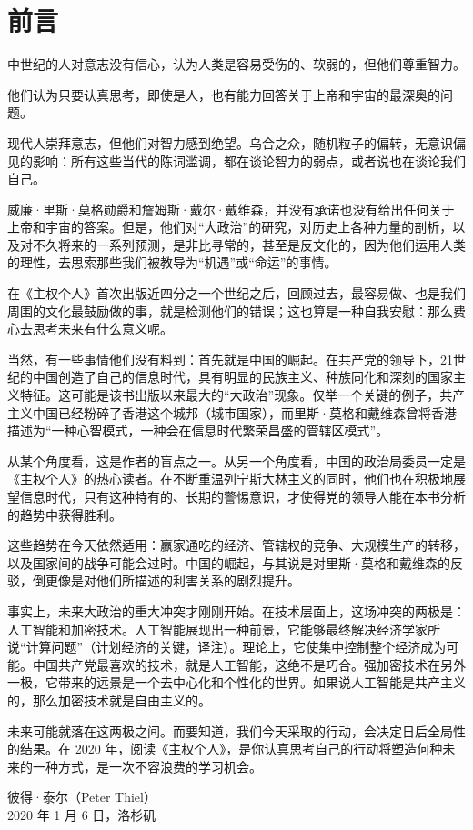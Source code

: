 \thispagestyle{empty}
\chapter*{前言}

中世纪的人对意志没有信心，认为人类是容易受伤的、软弱的，但他们尊重智力。

他们认为只要认真思考，即使是人，也有能力回答关于上帝和宇宙的最深奥的问题。


现代人崇拜意志，但他们对智力感到绝望。乌合之众，随机粒子的偏转，无意识偏见的影响：所有这些当代的陈词滥调，都在谈论智力的弱点，或者说也在谈论我们自己。


威廉·里斯·莫格勋爵和詹姆斯·戴尔·戴维森，并没有承诺也没有给出任何关于上帝和宇宙的答案。但是，他们对“大政治”的研究，对历史上各种力量的剖析，以及对不久将来的一系列预测，是非比寻常的，甚至是反文化的，因为他们运用人类的理性，去思索那些我们被教导为“机遇”或“命运”的事情。


在《主权个人》首次出版近四分之一个世纪之后，回顾过去，最容易做、也是我们周围的文化最鼓励做的事，就是检测他们的错误；这也算是一种自我安慰：那么费心去思考未来有什么意义呢。


当然，有一些事情他们没有料到：首先就是中国的崛起。在共产党的领导下，21世纪的中国创造了自己的信息时代，具有明显的民族主义、种族同化和深刻的国家主义特征。这可能是该书出版以来最大的“大政治”现象。仅举一个关键的例子，共产主义中国已经粉碎了香港这个城邦（城市国家），而里斯·莫格和戴维森曾将香港描述为“一种心智模式，一种会在信息时代繁荣昌盛的管辖区模式”。

从某个角度看，这是作者的盲点之一。从另一个角度看，中国的政治局委员一定是《主权个人》的热心读者。在不断重温列宁斯大林主义的同时，他们也在积极地展望信息时代，只有这种特有的、长期的警惕意识，才使得党的领导人能在本书分析的趋势中获得胜利。


这些趋势在今天依然适用：赢家通吃的经济、管辖权的竞争、大规模生产的转移，以及国家间的战争可能会过时。中国的崛起，与其说是对里斯·莫格和戴维森的反驳，倒更像是对他们所描述的利害关系的剧烈提升。


事实上，未来大政治的重大冲突才刚刚开始。在技术层面上，这场冲突的两极是：人工智能和加密技术。人工智能展现出一种前景，它能够最终解决经济学家所说“计算问题”（计划经济的关键，译注）。理论上，它使集中控制整个经济成为可能。中国共产党最喜欢的技术，就是人工智能，这绝不是巧合。强加密技术在另外一极，它带来的远景是一个去中心化和个性化的世界。如果说人工智能是共产主义的，那么加密技术就是自由主义的。


未来可能就落在这两极之间。而要知道，我们今天采取的行动，会决定日后全局性的结果。在 2020 年，阅读《主权个人》，是你认真思考自己的行动将塑造何种未来的一种方式，是一次不容浪费的学习机会。

\begin{flushright}
\kaishu 彼得·泰尔（Peter Thiel）\\
2020 年 1 月 6 日，洛杉矶
\end{flushright} 

\let\cleardoublepage\clearpage